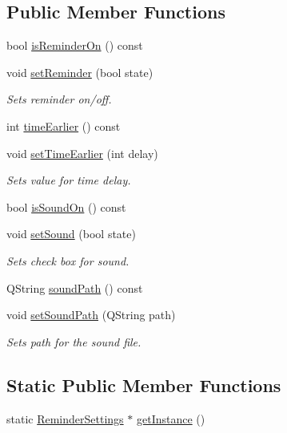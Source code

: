 \subsection*{Public Member Functions}
\begin{DoxyCompactItemize}
\item 
bool \hyperlink{class_reminder_settings_a087fbeb08e6ca903904dce65b231cadf}{is\-Reminder\-On} () const 
\item 
void \hyperlink{class_reminder_settings_a2feb4f5d1ebf3ff0dbf60b425d602c93}{set\-Reminder} (bool state)
\begin{DoxyCompactList}\small\item\em Sets reminder on/off. \end{DoxyCompactList}\item 
int \hyperlink{class_reminder_settings_a93cd63fd5a06b13d524f7d3b37d3a314}{time\-Earlier} () const 
\item 
void \hyperlink{class_reminder_settings_a95bdf3f076b48923163180432f48f8d1}{set\-Time\-Earlier} (int delay)
\begin{DoxyCompactList}\small\item\em Sets value for time delay. \end{DoxyCompactList}\item 
bool \hyperlink{class_reminder_settings_add13263fe45756d27f4a0ba3188f9015}{is\-Sound\-On} () const 
\item 
void \hyperlink{class_reminder_settings_acbce9ec5004d38a8371e7bc2df04c109}{set\-Sound} (bool state)
\begin{DoxyCompactList}\small\item\em Sets check box for sound. \end{DoxyCompactList}\item 
Q\-String \hyperlink{class_reminder_settings_a7ebd2228ac62990bc2e0b13a9b418f6f}{sound\-Path} () const 
\item 
void \hyperlink{class_reminder_settings_aece7223f9a74a23e1e8043f74f058bc1}{set\-Sound\-Path} (Q\-String path)
\begin{DoxyCompactList}\small\item\em Sets path for the sound file. \end{DoxyCompactList}\end{DoxyCompactItemize}
\subsection*{Static Public Member Functions}
\begin{DoxyCompactItemize}
\item 
static \hyperlink{class_reminder_settings}{Reminder\-Settings} $\ast$ \hyperlink{class_reminder_settings_a4b37dca12a6091c0d9f5b38477905d6e}{get\-Instance} ()
\end{DoxyCompactItemize}
